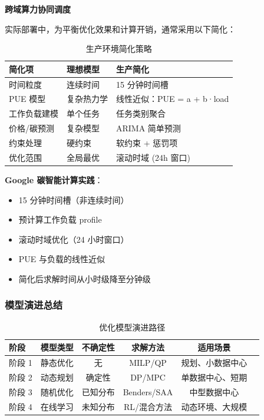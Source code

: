 \documentclass[12pt,a4paper]{article}
\begin{document}
\textbf{跨域算力协同调度}

实际部署中，为平衡优化效果和计算开销，通常采用以下简化：

\begin{table}[h]
\centering
\caption{生产环境简化策略}
\label{tab:production-simplifications}
\begin{tabular}{@{}p{4cm}p{4cm}p{4cm}@{}}
\toprule
\textbf{简化项} & \textbf{理想模型} & \textbf{生产简化} \\
\midrule
时间粒度 & 连续时间 & 15 分钟时间槽 \\
PUE 模型 & 复杂热力学 & 线性近似：PUE = a + b·load \\
工作负载建模 & 单个任务 & 任务类别聚合 \\
价格/碳预测 & 复杂模型 & ARIMA 简单预测 \\
约束处理 & 硬约束 & 软约束 + 惩罚项 \\
优化范围 & 全局最优 & 滚动时域 (24h 窗口) \\
\bottomrule
\end{tabular}
\end{table}

\textbf{Google 碳智能计算实践}\cite{google2021carbon}：
\begin{itemize}
    \item 15 分钟时间槽（非连续时间）
    \item 预计算工作负载 profile
    \item 滚动时域优化（24 小时窗口）
    \item PUE 与负载的线性近似
    \item 简化后求解时间从小时级降至分钟级
\end{itemize}

\subsubsection{模型演进总结}

\begin{table}[h]
\centering
\caption{优化模型演进路径}
\label{tab:model-evolution}
\begin{tabular}{@{}lccccc@{}}
\toprule
\textbf{阶段} & \textbf{模型类型} & \textbf{不确定性} & \textbf{求解方法} & \textbf{适用场景} \\
\midrule
阶段 1 & 静态优化 & 无 & MILP/QP & 规划、小数据中心 \\
阶段 2 & 动态规划 & 确定性 & DP/MPC & 单数据中心、短期 \\
阶段 3 & 随机优化 & 已知分布 & Benders/SAA & 中型数据中心 \\
阶段 4 & 在线学习 & 未知分布 & RL/混合方法 & 动态环境、大规模 \\
\bottomrule
\end{tabular}
\end{table}
\end{document}
